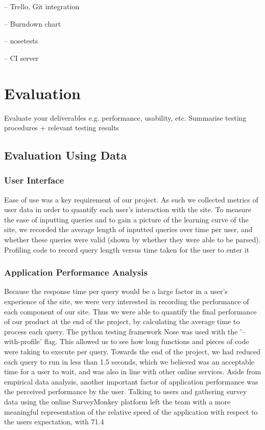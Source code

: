 \documentclass[a4paper, 11pt]{article}
\begin{document}
    -- Trello, Git integration

    -- Burndown chart

    -- nosetests

    -- CI server
 
\section{Evaluation}
  Evaluate your deliverables e.g. performance, usability, etc.
  Summarise testing procedures + relevant testing results




  \subsection{Evaluation Using Data}
  \subsubsection{User Interface}
Ease of use was a key requirement of our project. As such we collected metrics of user data in order to quantify each user's interaction with the site. To measure the ease of inputting queries and to gain a picture of the learning curve of the site, we recorded the average length of inputted queries over time per user, and whether these queries were valid (shown by whether they were able to be parsed).
Profiling code to record query length versus time taken for the user to enter it
\subsubsection{Application Performance Analysis}
Because the response time per query would be a large factor in a user's experience of the site, we were very interested in recording the performance of each component of our site. Thus we were able to quantify the final performance of our product at the end of the project, by calculating the average time to process each query.
The python testing framework Nose was used with the '--with-profile' flag. This allowed us to see how long functions and pieces of code were taking to execute per query. Towards the end of the project, we had reduced each query to run in less than 1.5 seconds, which we believed was an acceptable time for a user to wait, and was also in line with other online services.
Aside from empirical data analysis, another important factor of application performance was the perceived performance by the user. Talking to users and gathering survey data using the online SurveyMonkey platform left the team with a more meaningful representation of the relative speed of the application with respect to the users expectation, with 71.4%
\end{document}
